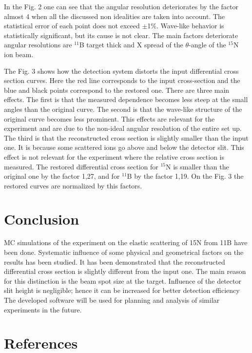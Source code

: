 \documentclass[%
 aip,
cp,  %
 amsmath,amssymb,%
 reprint,%
]{revtex4-2}
\begin{document}
In the Fig. 2 one can see that the angular resolution deteriorates by the factor almost 4 when all the discussed non idealities are taken into account. The statistical error of each point does not exceed $\pm$1$\%$. Wave-like behavior is statistically significant, but its cause is not clear. The main factors deteriorate angular resolutions are ${}^{11}$B target thick and X spread of the $\theta$-angle of the ${}^{15}$N ion beam.

The Fig. 3 shows how the detection system distorts the input differential cross section curves. Here the red line corresponds to the input cross-section and the blue and black points correspond to the restored one. There are three main effects. The first is that the measured dependence becomes less steep at the small angles than the original curve. The second is that the wave-like structure of the original curve becomes less prominent. This effects are relevant for the experiment and are due to the non-ideal angular resolution of the entire set up.
The third is that the reconstructed cross section is slightly smaller than the input one. It is because some scattered ions go above and below the detector slit. This effect is not relevant for the experiment where the relative cross section is measured. The restored differential cross section for ${}^{15}$N is smaller than the original one by the factor 1,27, and for ${}^{11}$B by the factor 1,19. On the Fig. 3 the restored curves are normalized by this factors.

\section{Conclusion}

MC simulations of the experiment on the elastic scattering of 15N from 11B have been done. Systematic influence of some physical and geometrical factors on the results has been studied. It has been demonstrated that the reconstructed differential cross section is slightly different from the input one. The main reason for this distinction is the beam spot size at the target. Influence of the detector slit height is negligible; hence it can be increased for better detection efficiency The developed software will be used for planning and analysis of similar experiments in the future.

\section{References}
\end{document}
